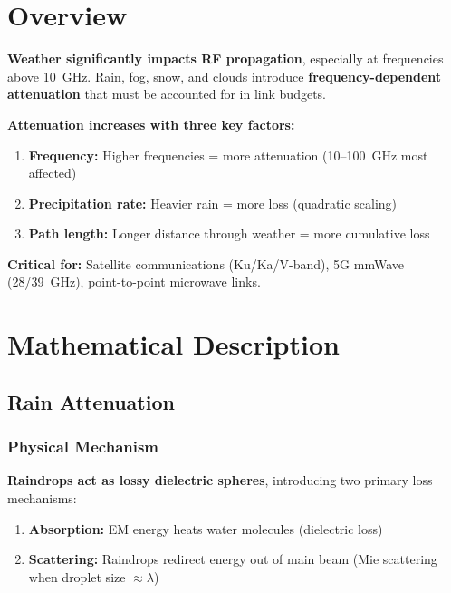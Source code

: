 \section{Overview}

\textbf{Weather significantly impacts RF propagation}, especially at frequencies above 10~GHz. Rain, fog, snow, and clouds introduce \textbf{frequency-dependent attenuation} that must be accounted for in link budgets.

\begin{keyconcept}
\textbf{Attenuation increases with three key factors:}
\begin{enumerate}
\item \textbf{Frequency:} Higher frequencies = more attenuation (10--100~GHz most affected)
\item \textbf{Precipitation rate:} Heavier rain = more loss (quadratic scaling)
\item \textbf{Path length:} Longer distance through weather = more cumulative loss
\end{enumerate}

\textbf{Critical for:} Satellite communications (Ku/Ka/V-band), 5G mmWave (28/39~GHz), point-to-point microwave links.
\end{keyconcept}

\section{Mathematical Description}

\subsection{Rain Attenuation}

\subsubsection{Physical Mechanism}

\textbf{Raindrops act as lossy dielectric spheres}, introducing two primary loss mechanisms:

\begin{enumerate}
\item \textbf{Absorption:} EM energy heats water molecules (dielectric loss)
\item \textbf{Scattering:} Raindrops redirect energy out of main beam (Mie scattering when droplet size $\approx \lambda$)
\end{enumerate}

